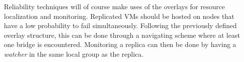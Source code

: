 Reliability techniques will of course make uses of the overlays
for resource localization and monitoring. 
Replicated VMs should be hosted on nodes that have a low
probability to fail simultaneously. Following the previously defined
overlay structure, this can be done through a navigating scheme where
at least one bridge is encountered. Monitoring a replica can then be
done by having a \emph{watcher} in the same local group as the
replica.





%

